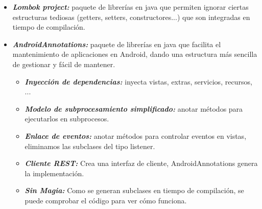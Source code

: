 \begin{itemize}
	\item \emph{\textbf{Lombok project: }} paquete de librerías en java que permiten ignorar ciertas estructuras tediosas (getters, setters, constructores...) que son integradas en tiempo de compilación. \cite{lombok}
	
	\item \emph{\textbf{AndroidAnnotations: }} paquete de librerías en java que facilita el mantenimiento de aplicaciones en Android, dando una estructura más sencilla de gestionar y fácil de mantener.\cite{ann}
	\begin{itemize}
		\item \emph{\textbf{Inyección de dependencias: }} inyecta vistas, extras,  servicios, recursos, ...
		\item \emph{\textbf{Modelo de subprocesamiento simplificado: }} anotar métodos para ejecutarlos en subprocesos.
		\item \emph{\textbf{Enlace de eventos: }} anotar métodos para controlar eventos en vistas, eliminamos las subclases del tipo\textsl{} listener.
		\item \emph{\textbf{Cliente REST: }} Crea una interfaz de cliente, AndroidAnnotations genera la implementación.
		\item \emph{\textbf{Sin Magia: }} Como se generan subclases en tiempo de compilación, se puede comprobar el código para ver cómo funciona.	
	\end{itemize}
\end{itemize}
